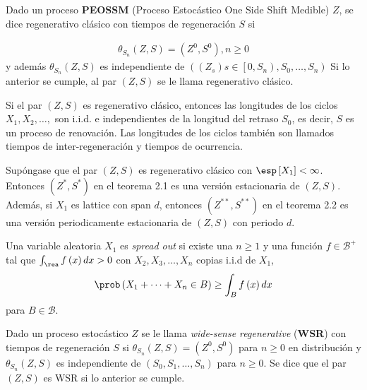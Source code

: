 \begin{Def}
Dado un proceso \textbf{PEOSSM} (Proceso Estoc\'astico One Side Shift Medible) $Z$, se dice regenerativo cl\'asico con tiempos de regeneraci\'on $S$ si 

\begin{eqnarray*}
\theta_{S_{n}}\left(Z,S\right)=\left(Z^{0},S^{0}\right),n\geq0
\end{eqnarray*}
y adem\'as $\theta_{S_{n}}\left(Z,S\right)$ es independiente de $\left(\left(Z_{s}\right)s\in\left[0,S_{n}\right),S_{0},\ldots,S_{n}\right)$
Si lo anterior se cumple, al par $\left(Z,S\right)$ se le llama regenerativo cl\'asico.
\end{Def}

\begin{Note}
Si el par $\left(Z,S\right)$ es regenerativo cl\'asico, entonces las longitudes de los ciclos $X_{1},X_{2},\ldots,$ son i.i.d. e independientes de la longitud del retraso $S_{0}$, es decir, $S$ es un proceso de renovaci\'on. Las longitudes de los ciclos tambi\'en son llamados tiempos de inter-regeneraci\'on y tiempos de ocurrencia.

\end{Note}

\begin{Teo}
Sup\'ongase que el par $\left(Z,S\right)$ es regenerativo cl\'asico con $\esp\left[X_{1}\right]<\infty$. Entonces $\left(Z^{*},S^{*}\right)$ en el teorema 2.1 es una versi\'on estacionaria de $\left(Z,S\right)$. Adem\'as, si $X_{1}$ es lattice con span $d$, entonces $\left(Z^{**},S^{**}\right)$ en el teorema 2.2 es una versi\'on periodicamente estacionaria de $\left(Z,S\right)$ con periodo $d$.

\end{Teo}

\begin{Def}
Una variable aleatoria $X_{1}$ es \textit{spread out} si existe una $n\geq1$ y una  funci\'on $f\in\mathcal{B}^{+}$ tal que $\int_{\rea}f\left(x\right)dx>0$ con $X_{2},X_{3},\ldots,X_{n}$ copias i.i.d  de $X_{1}$, $$\prob\left(X_{1}+\cdots+X_{n}\in B\right)\geq\int_{B}f\left(x\right)dx$$ para $B\in\mathcal{B}$.

\end{Def}



\begin{Def}
Dado un proceso estoc\'astico $Z$ se le llama \textit{wide-sense regenerative} (\textbf{WSR}) con tiempos de regeneraci\'on $S$ si $\theta_{S_{n}}\left(Z,S\right)=\left(Z^{0},S^{0}\right)$ para $n\geq0$ en distribuci\'on y $\theta_{S_{n}}\left(Z,S\right)$ es independiente de $\left(S_{0},S_{1},\ldots,S_{n}\right)$ para $n\geq0$.
Se dice que el par $\left(Z,S\right)$ es WSR si lo anterior se cumple.
\end{Def}


